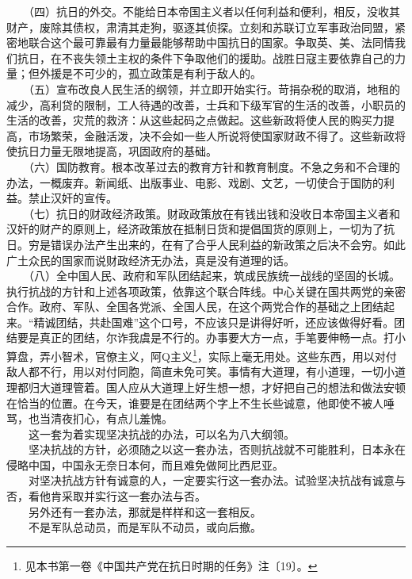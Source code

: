 \documentclass[cn,11pt,chinese]{elegantbook}
\begin{document}
　　（四）抗日的外交。不能给日本帝国主义者以任何利益和便利，相反，没收其财产，废除其债权，肃清其走狗，驱逐其侦探。立刻和苏联订立军事政治同盟，紧密地联合这个最可靠最有力量最能够帮助中国抗日的国家。争取英、美、法同情我们抗日，在不丧失领土主权的条件下争取他们的援助。战胜日寇主要依靠自己的力量；但外援是不可少的，孤立政策是有利于敌人的。\\
　　（五）宣布改良人民生活的纲领，并立即开始实行。苛捐杂税的取消，地租的减少，高利贷的限制，工人待遇的改善，士兵和下级军官的生活的改善，小职员的生活的改善，灾荒的救济：从这些起码之点做起。这些新政将使人民的购买力提高，市场繁荣，金融活泼，决不会如一些人所说将使国家财政不得了。这些新政将使抗日力量无限地提高，巩固政府的基础。\\
　　（六）国防教育。根本改革过去的教育方针和教育制度。不急之务和不合理的办法，一概废弃。新闻纸、出版事业、电影、戏剧、文艺，一切使合于国防的利益。禁止汉奸的宣传。\\
　　（七）抗日的财政经济政策。财政政策放在有钱出钱和没收日本帝国主义者和汉奸的财产的原则上，经济政策放在抵制日货和提倡国货的原则上，一切为了抗日。穷是错误办法产生出来的，在有了合乎人民利益的新政策之后决不会穷。如此广土众民的国家而说财政经济无办法，真是没有道理的话。\\
　　（八）全中国人民、政府和军队团结起来，筑成民族统一战线的坚固的长城。执行抗战的方针和上述各项政策，依靠这个联合阵线。中心关键在国共两党的亲密合作。政府、军队、全国各党派、全国人民，在这个两党合作的基础之上团结起来。“精诚团结，共赴国难”这个口号，不应该只是讲得好听，还应该做得好看。团结要是真正的团结，尔诈我虞是不行的。办事要大方一点，手笔要伸畅一点。打小算盘，弄小智术，官僚主义，阿Q主义\footnote[6]{ 见本书第一卷《中国共产党在抗日时期的任务》注〔19〕。}，实际上毫无用处。这些东西，用以对付敌人都不行，用以对付同胞，简直未免可笑。事情有大道理，有小道理，一切小道理都归大道理管着。国人应从大道理上好生想一想，才好把自己的想法和做法安顿在恰当的位置。在今天，谁要是在团结两个字上不生长些诚意，他即使不被人唾骂，也当清夜扪心，有点儿羞愧。\\
　　这一套为着实现坚决抗战的办法，可以名为八大纲领。\\
　　坚决抗战的方针，必须随之以这一套办法，否则抗战就不可能胜利，日本永在侵略中国，中国永无奈日本何，而且难免做阿比西尼亚。\\
　　对坚决抗战方针有诚意的人，一定要实行这一套办法。试验坚决抗战有诚意与否，看他肯采取并实行这一套办法与否。\\
　　另外还有一套办法，那就是样样和这一套相反。\\
　　不是军队总动员，而是军队不动员，或向后撤。\\
\end{document}
